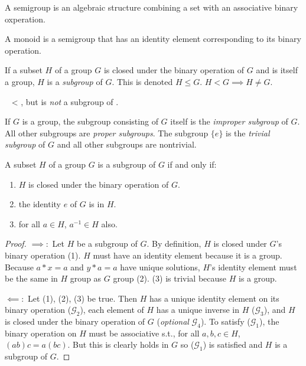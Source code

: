 \begin{definition}[Semigroup]
    A semigroup is an algebraic structure combining a set with an associative binary oxperation.
\end{definition}
\begin{definition}[Monoid]
    A monoid is a semigroup that has an identity element corresponding to its binary operation. 
\end{definition}
\begin{definition}[Subgroup]
    If a subset $H$ of a group $G$ is closed under the binary operation of $G$ and is itself a group, $H$ is a \emph{subgroup} of $G$. This is denoted $H \leq G$. $H < G \implies H \neq G$.
\end{definition}
\begin{example}
    \ \group{\Z}{+} < \group{\R}{+}, but \group{\Q}{\cdot} is \emph{not} a subgroup of \group{\R}{-}.
\end{example}
\begin{definition}
    If $G$ is a group, the subgroup consisting of $G$ itself is the \emph{improper subgroup} of $G$. All other subgroups are \emph{proper subgroups}. The subgroup $\{e\}$ is the \emph{trivial subgroup} of $G$ and all other subgroups are nontrivial.
\end{definition}
\begin{theorem}
    A subset $H$ of a group $G$ is a subgroup of $G$ if and only if:
    \begin{enumerate}
        \item $H$ is closed under the binary operation of $G$.
        \item the identity $e$ of $G$ is in $H$.
        \item for all $a \in H$, $a^{-1} \in H$ also.
    \end{enumerate}
\end{theorem}
\begin{proof}
    $\implies:$ Let $H$ be a subgroup of $G$. By definition, $H$ is closed under $G$'s binary operation (1). $H$ must have an identity element because it is a group. Because $a*x=a$ and $y*a=a$ have unique solutions, $H$'s identity element must be the same in $H$ group as $G$ group (2). (3) is trivial because $H$ is a group.

    $\impliedby:$ Let (1), (2), (3) be true. Then $H$ has a unique identity element on its binary operation ($\mathscr{G}_2$), each element of $H$ has a unique inverse in $H$ ($\mathscr{G}_3$), and $H$ is closed under the binary operation of $G$ (\emph{optional} $\mathscr{G}_4$). To satisfy ($\mathscr{G}_1$), the binary operation on $H$ must be associative s.t., for all $a,b,c \in H$, $(ab)c = a(bc)$. But this is clearly holds in $G$ so ($\mathscr{G}_1$) is satisfied and $H$ is a subgroup of $G$.
\end{proof}

